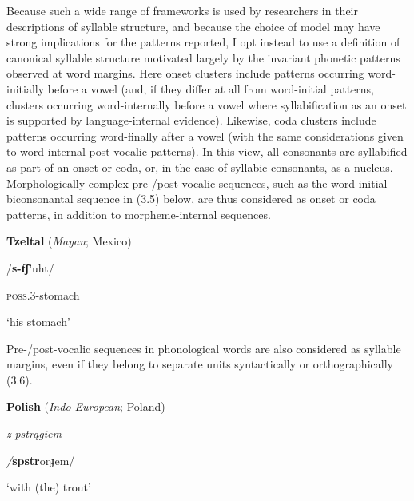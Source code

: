   Because such a wide range of frameworks is used by researchers in their descriptions of syllable structure, and because the choice of model may have strong implications for the patterns reported, I opt instead to use a definition of canonical syllable structure motivated largely by the invariant phonetic patterns observed at word margins. Here onset clusters include patterns occurring word-initially before a vowel (and, if they differ at all from word-initial patterns, clusters occurring word-internally before a vowel where syllabification as an onset is supported by language-internal evidence). Likewise, coda clusters include patterns occurring word-finally after a vowel (with the same considerations given to word-internal post-vocalic patterns). In this view, all consonants are syllabified as part of an onset or coda, or, in the case of syllabic consonants, as a nucleus. Morphologically complex pre-/post-vocalic sequences, such as the word-initial biconsonantal sequence in (3.5) below, are thus considered as onset or coda patterns, in addition to morpheme-internal sequences.



\ea\label{ex:(3.5)}
   \textbf{Tzeltal} (\textit{Mayan}; Mexico)



/\textbf{s-t͡ʃ’}uht/



\textsc{poss.3}{}-stomach



‘his stomach’



\citep[24]{Polian2006}
\z



Pre-/post-vocalic sequences in phonological words are also considered as syllable margins, even if they belong to separate units syntactically or orthographically (3.6).



\ea\label{ex:(3.6)}
   \textbf{Polish} (\textit{Indo-European}; Poland)



\textit{z} \textit{pstrągiem}



\textit{/}\textbf{spstr}oŋɟem/



‘with (the) trout’



\citep[103]{Jassem2003}

\z


